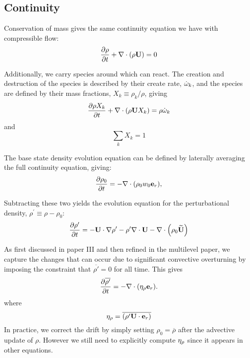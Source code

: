 \subsection{Continuity}

Conservation of mass gives the same continuity equation we have with
compressible flow:
\begin{equation}
\frac{\partial \rho}{\partial t} + \nabla \cdot (\rho {\bf U}) = 0
\label{eq:flow:continuity}
\end{equation}

Additionally, we carry species around which can react.  The creation and destruction
of the species is described by their create rate, $\dot{\omega}_k$, and the species
are defined by their mass fractions, $X_k \equiv \rho_k / \rho$, giving
\begin{equation}
\frac{\partial \rho X_k}{\partial t} + \nabla \cdot (\rho {\bf U} X_k) = \rho \dot{\omega}_k
\label{eq:flow:rhoX}
\end{equation}
and
\begin{equation}
\sum_k X_k = 1
\end{equation}

The base state density evolution equation can be defined by laterally averaging the 
full continuity equation, giving:
\begin{equation}
\frac{\partial\rho_0}{\partial t} = -\nabla\cdot(\rho_0 w_0 {\bf e}_r),\label{eq:flow:base_density}
\end{equation}

Subtracting these two yields the evolution equation for the perturbational
density, $\rho^\prime \equiv \rho - \rho_0$:
\begin{equation}
\frac{\partial\rho'}{\partial t} = -{\bf U}\cdot\nabla\rho' -
  \rho'\nabla\cdot{\bf U} - \nabla\cdot\left(\rho_0\widetilde{{\bf U}}\right) \label{eq:flow:rhoprime}
\end{equation}

As first discussed in paper III and then refined in the multilevel paper, we capture
the changes that can occur due to significant convective
overturning by imposing the constraint that $\overline{\rho'}=0$
for all time.  This gives
\begin{equation}
\frac{\partial\overline{\rho'}}{\partial t} = -\nabla\cdot(\eta_{\rho}{\bf e}_r).
\end{equation}
where
\begin{equation}
\eta_{\rho} = \overline{\left(\rho'{\bf U}\cdot{\bf e}_r\right)}
\label{eq:flow:etarho}
\end{equation}
In practice, we correct the drift by simply setting $\rho_0 =
\overline{\rho}$ after the advective update of $\rho$.  However we still need to
explicitly compute $\eta_{\rho}$ since it appears in other equations.


